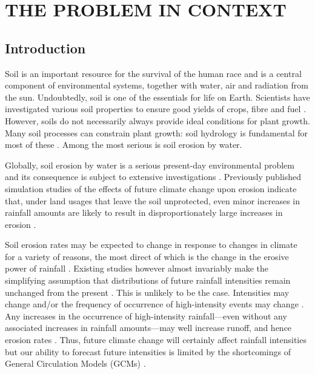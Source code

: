 \chapter{THE PROBLEM IN CONTEXT}
\label{sec:PROBLEMINTHECONTEXT}

\section{Introduction}
\label{sec:Rationale}
Soil is an important resource for the survival of the human race and is a
central component of environmental systems, together with water, air and
radiation from the sun. Undoubtedly, soil is one of the essentials for life on
Earth. Scientists have investigated various soil properties to ensure good
yields of crops, fibre and fuel \citep{cresser1993-192}. However, soils do not
necessarily always provide ideal conditions for plant growth. Many soil
processes can constrain plant growth: soil hydrology is fundamental for most of
these \citep{hudson1971-320, evans1980-mechanics, kirkby1980-1,
morgan1995-soil}. Among the most serious is soil erosion by water.

Globally, soil erosion by water is a serious present-day environmental problem
and its consequence is subject to extensive investigations
\citep{kirkby1980-1,morgan1995-soil}. Previously published simulation studies of
the effects of future climate change upon erosion indicate that, under land
usages that leave the soil unprotected, even minor increases in rainfall amounts
are likely to result in disproportionately large increases in erosion
\citep{kirkby1980-1, favis-mortlock1995-365}.

Soil erosion rates may be expected to change in response to changes in climate
for a variety of reasons, the most direct of which is the change in the erosive
power of rainfall
\citep{favis-mortlock1996-529,williams1996-381,favis-mortlock1999-329,
nearing2001-229,pruski2002-climate}.
Existing studies however almost invariably make the simplifying assumption that
distributions of future rainfall intensities remain unchanged from the present
\citep{favis-mortlock1995-265,favis-mortlock1995-365}. This is unlikely to be
the case.
Intensities may change and/or the frequency of occurrence of high-intensity
events may change \citep{houghton1996-climate, watson1998-517}. Any increases in
the occurrence of high-intensity rainfall---even without any associated
increases in rainfall amounts---may well increase runoff, and hence erosion
rates \citep{kirkby1980-1, morgan1995-soil, parsons2000-723}. Thus, future
climate change will certainly affect rainfall intensities but our ability to
forecast future intensities is limited by the shortcomings of General
Circulation Models (GCMs) \citep{favis-mortlock1995-365}.

